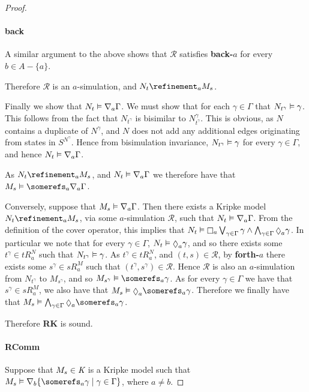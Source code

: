 \begin{proof}
\paragraph{back} A similar argument to the above shows that $\mathcal{R}$
satisfies {\bf back-$a$} for every $b \in A - \{a\}$.

Therefore $\mathcal{R}$ is an $a$-simulation, and $N_t \refinement_a M_s$.

Finally we show that $N_t \vDash \nabla_a \Gamma$. We must show that for each
$\gamma \in \Gamma$ that $N_{t^\gamma} \vDash \gamma$. This follows from the
fact that $N_{t^\gamma}$ is bisimilar to $N^\gamma_{t^\gamma}$. This is obvious,
as $N$ contains a duplicate of $N^\gamma$, and $N$ does not add any additional
edges originating from states in $S^{N^\gamma}$. Hence from bisimulation
invariance, $N_{t^\gamma} \vDash \gamma$ for every $\gamma \in \Gamma$, and
hence $N_t \vDash \nabla_a \Gamma$.

As $N_t \refinement_a M_s$, and $N_t \vDash \nabla_a \Gamma$ we therefore
have that $M_s \entails \somerefs_a \covers_a \Gamma$.

Conversely, suppose that $M_s \vDash \nabla_a \Gamma$. Then there exists a
Kripke model $N_t \refinement_a M_s$, via some $a$-simulation $\mathcal{R}$,
such that $N_t \vDash \nabla_a \Gamma$. From the definition of the cover
operator, this implies that $N_t \entails \knows_a \bigvee_{\gamma \in \Gamma}
\gamma \land \bigwedge_{\gamma \in \Gamma} \suspects_a \gamma$. In particular we
note that for every $\gamma \in \Gamma$, $N_t \entails \suspects_a \gamma$, and
so there exists some $t^\gamma \in tR^N_a$ such that $N_{t^\gamma} \vDash
\gamma$. As $t^\gamma \in tR^N_a$, and $(t, s) \in \mathcal{R}$, by {\bf
forth-$a$} there exists some $s^\gamma \in sR^M_a$ such that $(t^\gamma, s^\gamma)
\in \mathcal{R}$. Hence $\mathcal{R}$ is also an $a$-simulation from
$N_{t^\gamma}$ to $M_{s^\gamma}$, and so $M_{s^\gamma} \entails \somerefs_a
\gamma$. As for every $\gamma \in \Gamma$ we have that $s^\gamma \in sR^M_a$, we
also have that $M_s \entails \suspects_a \somerefs_a \gamma$. Therefore we
finally have that $M_s \entails \bigwedge_{\gamma \in \Gamma} \suspects_a
\somerefs_a \gamma$.

Therefore {\bf RK} is sound.

\paragraph{RComm}
Suppose that $M_s \in \textit{K}$ is a Kripke model such that $M_s \entails
\covers_b \{ \somerefs_a \gamma \mid \gamma \in \Gamma\}$, where $a \neq b$.


\end{proof}
